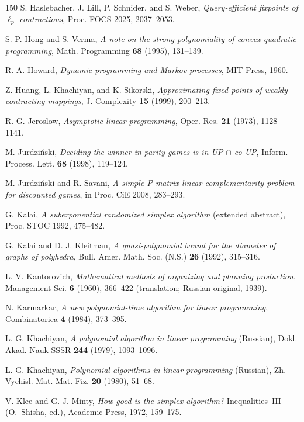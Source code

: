 \begin{thebibliography}{150}
S. Haslebacher, J. Lill, P. Schnider, and S. Weber, \emph{Query-efficient fixpoints of \(\ell_p\)-contractions}, Proc. FOCS 2025, 2037--2053.

S.-P. Hong and S. Verma, \emph{A note on the strong polynomiality of convex quadratic programming}, Math. Programming \textbf{68} (1995), 131--139.

R. A. Howard, \emph{Dynamic programming and Markov processes}, MIT Press, 1960.

Z. Huang, L. Khachiyan, and K. Sikorski, \emph{Approximating fixed points of weakly contracting mappings}, J. Complexity \textbf{15} (1999), 200--213.

R. G. Jeroslow, \emph{Asymptotic linear programming}, Oper. Res. \textbf{21} (1973), 1128--1141.

M. Jurdzi\'nski, \emph{Deciding the winner in parity games is in UP \(\cap\) co-UP}, Inform. Process. Lett. \textbf{68} (1998), 119--124.

M. Jurdzi\'nski and R. Savani, \emph{A simple P-matrix linear complementarity problem for discounted games}, in Proc. CiE 2008, 283--293.

G. Kalai, \emph{A subexponential randomized simplex algorithm} (extended abstract), Proc. STOC 1992, 475--482.

G. Kalai and D. J. Kleitman, \emph{A quasi-polynomial bound for the diameter of graphs of polyhedra}, Bull. Amer. Math. Soc. (N.S.) \textbf{26} (1992), 315--316.

L. V. Kantorovich, \emph{Mathematical methods of organizing and planning production}, Management Sci. \textbf{6} (1960), 366--422 (translation; Russian original, 1939).

N. Karmarkar, \emph{A new polynomial-time algorithm for linear programming}, Combinatorica \textbf{4} (1984), 373--395.

L. G. Khachiyan, \emph{A polynomial algorithm in linear programming} (Russian), Dokl. Akad. Nauk SSSR \textbf{244} (1979), 1093--1096.

L. G. Khachiyan, \emph{Polynomial algorithms in linear programming} (Russian), Zh. Vychisl. Mat. Mat. Fiz. \textbf{20} (1980), 51--68.

V. Klee and G. J. Minty, \emph{How good is the simplex algorithm?} Inequalities~III (O.~Shisha, ed.), Academic Press, 1972, 159--175.


\end{thebibliography}
